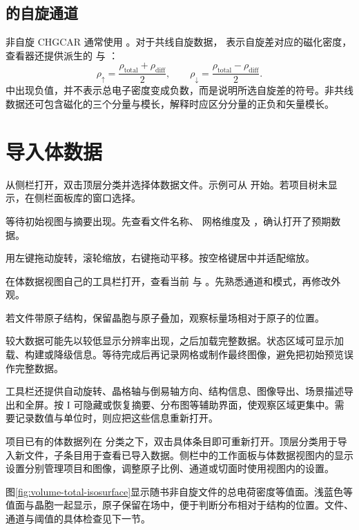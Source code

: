 \subsection{ 的自旋通道}

非自旋 CHGCAR 通常使用 。对于共线自旋数据， 表示自旋差对应的磁化密度，查看器还提供派生的  与 ：
\[
  \rho_{\uparrow}=\frac{\rho_{\mathrm{total}}+\rho_{\mathrm{diff}}}{2},
  \qquad
  \rho_{\downarrow}=\frac{\rho_{\mathrm{total}}-\rho_{\mathrm{diff}}}{2}.
\]
 中出现负值，并不表示总电子密度变成负数，而是说明所选自旋差的符号。非共线数据还可包含磁化的三个分量与模长，解释时应区分分量的正负和矢量模长。

\section{导入体数据}

\begin{steps}
  \item 从侧栏打开，双击顶层分类并选择体数据文件。示例可从  开始。若项目树未显示，在侧栏面板库的窗口选择。
  \item 等待初始视图与摘要出现。先查看文件名称、 网格维度及 ，确认打开了预期数据。
  \item 用左键拖动旋转，滚轮缩放，右键拖动平移。按空格键居中并适配缩放。
  \item 在体数据视图自己的工具栏打开，查看当前  与 。先熟悉通道和模式，再修改外观。
  \item 若文件带原子结构，保留晶胞与原子叠加，观察标量场相对于原子的位置。
\end{steps}

较大数据可能先以较低显示分辨率出现，之后加载完整数据。状态区域可显示加载、构建或降级信息。等待完成后再记录网格或制作最终图像，避免把初始预览误作完整数据。

工具栏还提供自动旋转、晶格轴与倒易轴方向、结构信息、图像导出、场景描述导出和全屏。按 I 可隐藏或恢复摘要、分布图等辅助界面，使观察区域更集中。需要记录数值与单位时，则应把这些信息重新打开。

项目已有的体数据列在  分类之下，双击具体条目即可重新打开。顶层分类用于导入新文件，子条目用于查看已导入数据。侧栏中的工作面板与体数据视图内的显示设置分别管理项目和图像，调整原子比例、通道或切面时使用视图内的设置。

图\ref{fig:volume-total-isosurface}显示随书非自旋文件的总电荷密度等值面。浅蓝色等值面与晶胞一起显示，原子保留在场中，便于判断分布相对于结构的位置。文件、通道与阈值的具体检查见下一节。

